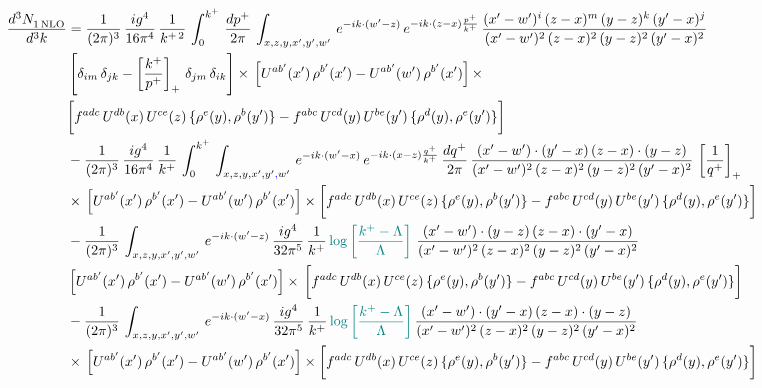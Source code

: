 \documentclass[9pt]{article}
\numberwithin{equation}{section}
\begin{document}
\begin{align}
     \frac{d^{3}N_{1\,\rm NLO}^{\rm}}{d^{3}k}  & = \frac{1}{(2\pi)^{3}}\, \frac{ig^{4}}{16\pi^{4}}\, \frac{1}{k^{+\,2}}\,\int_{0}^{k^{+}}\, \frac{dp^{+}}{2\pi}\,\int_{x,z,y,x',y'{\color{blue},}w'}\,e^{-ik\cdot (w^\prime-z)}\,e^{-ik\cdot (z-x)\frac{p^{+}}{k^{+}}}\,\frac{(x'-w')^{i}\,(z-x)^{m}\,(y-z)^{k}\,(y'-x)^{j}}{(x'-w')^{2}\,(z-x)^{2}\,(y-z)^{2}\,(y'-x)^{2}}\,\notag \\ & \left[\delta_{im}\,\delta_{jk}-\left[\frac{k^{+}}{p^{+}}\right]_{+}\, \delta_{jm}\,\delta_{ik}\right]\times\, \left[U^{ab'}(x')\,\rho^{b'}(x')-U^{ab'}(w')\,\rho^{b'}(x')\right]\times\notag \\ & \bigg[f^{adc}\,U^{db}(x)\,U^{ce}(z)\, \{\rho^{e}(y),\rho^{b}(y')\}-f^{abc}\,U^{cd}(y)\,U^{be}(y')\, \{\rho^{d}(y),\rho^{e}(y')\}\bigg]\notag \\ & -\frac{1}{(2\pi)^{3}}\, \frac{ig^{4}}{16\pi^{4}}\, \frac{1}{k^{+}}\,\int_{0}^{k^{+}}\, \int_{x,z,y,x',y'{\color{blue},}w'}\,e^{-ik\cdot (w^\prime-x)}\,e^{-ik\cdot (x-z)\frac{q^{+}}{k^{+}}}\,\frac{dq^{+}}{2\pi}\,\frac{(x'-w')\cdot (y'-x)\,(z-x)\cdot (y-z)}{(x'-w')^{2}\,(z-x)^{2}\,(y-z)^{2}\,(y'-x)^{2}}\,\left[\frac{1}{q^{+}}\right]_{+}\notag \\ & \times\, \left[U^{ab'}(x')\,\rho^{b'}(x')-U^{ab'}(w')\,\rho^{b'}(x')\right]\times \bigg[f^{adc}\,U^{db}(x)\,U^{ce}(z)\, \{\rho^{e}(y),\rho^{b}(y')\}-f^{abc}\,U^{cd}(y)\,U^{be}(y')\, \{\rho^{d}(y),\rho^{e}(y')\}\bigg]\notag \\ & -\frac{1}{(2\pi)^{3}}\, \int_{x,z,y,x',y'{\color{blue},}w'}\,e^{-ik\cdot (w^\prime-z)}\,\frac{ig^{4}}{32\pi^{5}}\, \frac{1}{k^{+}}\,{\color{teal} \log{\left[\frac{k^{+}-\Lambda}{\Lambda}\right]}}\,\,\frac{(x'-w')\cdot (y-z)\,(z-x)\cdot (y'-x)}{(x'-w')^{2}\,(z-x)^{2}\,(y-z)^{2}\,(y'-x)^{2}}\,\notag \\ & \left[U^{ab'}(x')\,\rho^{b'}(x')-U^{ab'}(w')\,\rho^{b'}(x')\right]\times\, \bigg[f^{adc}\,U^{db}(x)\,U^{ce}(z)\, \{\rho^{e}(y),\rho^{b}(y')\}-f^{abc}\,U^{cd}(y)\,U^{be}(y')\, \{\rho^{d}(y),\rho^{e}(y')\}\bigg]\notag \\ &  -\frac{1}{(2\pi)^{3}}\, \int_{x,z,y,x',y'{\color{blue},}w'}\,e^{-ik\cdot (w^\prime-x)}\,\frac{ig^{4}}{32\pi^{5}}\, \frac{1}{k^{+}}\,{\color{teal} \log{\left[\frac{k^{+}-\Lambda}{\Lambda}\right]}}\,\frac{(x'-w')\cdot (y'-x)\,(z-x)\cdot (y-z)}{(x'-w')^{2}\,(z-x)^{2}\,(y-z)^{2}\,(y'-x)^{2}}\notag \\ & \times\, \left[U^{ab'}(x')\,\rho^{b'}(x')-U^{ab'}(w')\,\rho^{b'}(x')\right]\times \bigg[f^{adc}\,U^{db}(x)\,U^{ce}(z)\, \{\rho^{e}(y),\rho^{b}(y')\}-f^{abc}\,U^{cd}(y)\,U^{be}(y')\, \{\rho^{d}(y),\rho^{e}(y')\}\bigg]
\end{align}
\end{document}
